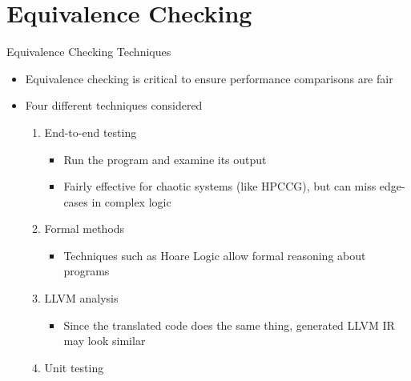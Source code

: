 \documentclass[10pt,aspectratio=169]{beamer}
\begin{document}




\section{Equivalence Checking}

\begin{frame}{Equivalence Checking Techniques}

    \begin{itemize}
        \item Equivalence checking is critical to ensure performance comparisons are fair
        \item Four different techniques considered
        \begin{enumerate}
            \item<1-> \alert<5>{End-to-end testing}
            \begin{itemize}
                \item Run the program and examine its output
                \item Fairly effective for chaotic systems (like HPCCG), but can miss edge-cases in complex logic %
            \end{itemize}
            \item<2-> Formal methods
            \begin{itemize}
                \item Techniques such as Hoare Logic \cite{hoareAxiomaticBasisComputer1969} allow formal reasoning about programs
            \end{itemize}
            \item<3-> LLVM analysis
            \begin{itemize}
                \item Since the translated code does the same thing, generated LLVM IR may look similar
            \end{itemize}
            \item<4-> \alert<5>{Unit testing}
            \begin{itemize}

\end{itemize}
\end{enumerate}
\end{itemize}
\end{frame}
\end{document}
